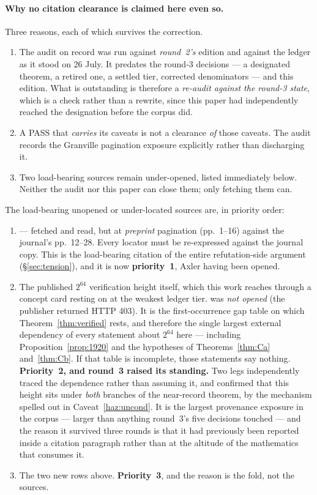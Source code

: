 \documentclass[11pt,a4paper]{article}
\theoremstyle{plain}
\theoremstyle{definition}
\theoremstyle{remark}
\begin{document}
\paragraph{Why no citation clearance is claimed here even so.} Three reasons, each of which
survives the correction.
\begin{enumerate}
\item The audit on record was run against \emph{round~2's} edition and against the ledger as it
  stood on 26 July. It predates the round-3 decisions --- a designated theorem, a retired one,
  a settled tier, corrected denominators --- and this edition. What is outstanding is
  therefore a \emph{re-audit against the round-3 state}, which is a check rather than a
  rewrite, since this paper had independently reached the designation before the corpus did.
\item A PASS that \emph{carries} its caveats is not a clearance \emph{of} those caveats. The
  audit records the Granville pagination exposure explicitly rather than discharging it.
\item Two load-bearing sources remain under-opened, listed immediately below. Neither the audit
  nor this paper can close them; only fetching them can.
\end{enumerate}

The load-bearing unopened or under-located sources are, in priority order:

\begin{enumerate}
\item \cite{granville1995cramer} --- fetched and read, but at \emph{preprint} pagination
  (pp.~1--16) against the journal's pp.~12--28. Every locator must be re-expressed against
  the journal copy. This is the load-bearing citation of the entire refutation-side argument
  (\S\ref{sec:tension}), and it is now \textbf{priority~1}, Axler having been opened.
\item The published $2^{64}$ verification height itself, which this work reaches through a
  concept card resting on \cite{oliveira2014goldbach} at the weakest ledger tier.
  \cite{oliveira2014goldbach} was \emph{not opened} (the publisher returned HTTP 403). It is
  the first-occurrence gap table on which Theorem~\ref{thm:verified} rests, and therefore the
  single largest external dependency of every statement about $2^{64}$ here --- including
  Proposition~\ref{prop:1920} and the hypotheses of Theorems~\ref{thm:Ca} and~\ref{thm:Cb}. If
  that table is incomplete, those statements say nothing. \textbf{Priority~2, and round~3
  raised its standing.} Two legs independently traced the dependence rather than assuming it,
  and confirmed that this height sits under \emph{both} branches of the near-record theorem, by
  the mechanism spelled out in Caveat~\ref{haz:uncond}. It is the largest provenance exposure
  in the corpus --- larger than anything round~3's five decisions touched --- and the reason it
  survived three rounds is that it had previously been reported inside a citation paragraph
  rather than at the altitude of the mathematics that consumes it.
\item The two new rows above. \textbf{Priority~3}, and the reason is the fold, not the sources.
\end{enumerate}
\end{document}
